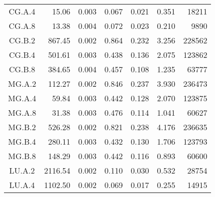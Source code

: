 \documentclass[../Main/thesis.tex]{subfiles}
\begin{document}
\begin{longtable}[c]{c*{6}{r}}
  CG.A.4                       & 15.06                        & 0.003                        & 0.067                      & 0.021                        & 0.351 & 18211  \\
  CG.A.8                       & 13.38                        & 0.004                        & 0.072                      & 0.023                        & 0.210 & 9890   \\
  CG.B.2                       & 867.45                       & 0.002                        & 0.864                      & 0.232                        & 3.256 & 228562 \\
  CG.B.4                       & 501.61                       & 0.003                        & 0.438                      & 0.136                        & 2.075 & 123862 \\
  CG.B.8                       & 384.65                       & 0.004                        & 0.457                      & 0.108                        & 1.235 & 63777  \\
  MG.A.2                       & 112.27                       & 0.002                        & 0.846                      & 0.237                        & 3.930 & 236473 \\
  MG.A.4                       & 59.84                        & 0.003                        & 0.442                      & 0.128                        & 2.070 & 123875 \\
  MG.A.8                       & 31.38                        & 0.003                        & 0.476                      & 0.114                        & 1.041 & 60627  \\
  MG.B.2                       & 526.28                       & 0.002                        & 0.821                      & 0.238                        & 4.176 & 236635 \\
  MG.B.4                       & 280.11                       & 0.003                        & 0.432                      & 0.130                        & 1.706 & 123793 \\
  MG.B.8                       & 148.29                       & 0.003                        & 0.442                      & 0.116                        & 0.893 & 60600  \\
  LU.A.2                       & 2116.54                      & 0.002                        & 0.110                      & 0.030                        & 0.532 & 28754  \\
  LU.A.4                       & 1102.50                      & 0.002                        & 0.069                      & 0.017                        & 0.255 & 14915  \\

\end{longtable}
\end{document}
